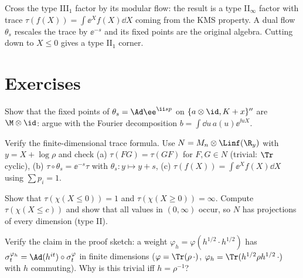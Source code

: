 \begin{keyidea}
Cross the type III$_1$ factor by its modular flow: the result is a type II$_\infty$ factor with trace $\tau(f(X))=\int\ee^{X}f(X)\dd X$ coming from the KMS property. A dual flow $\theta_s$ rescales the trace by $\ee^{-s}$ and its fixed points are the original algebra. Cutting down to $X\le0$ gives a type II$_1$ corner.
\end{keyidea}

\section*{Exercises}
\begin{exercise}
Show that the fixed points of $\theta_s=\Ad\ee^{\ii sp}$ on $\{a\otimes\id,K+x\}''$ are $\M\otimes\id$: argue with the Fourier decomposition $b=\int\dd u\,a(u)\ee^{\ii uX}$.
\end{exercise}
\begin{exercise}
Verify the finite-dimensional trace formula. Use $N=M_n\otimes\Linf(\R_y)$ with $y=X+\log\rho$ and check (a) $\tau(FG)=\tau(GF)$ for $F,G\in N$ (trivial: $\Tr$ cyclic), (b) $\tau\circ\theta_s=\ee^{-s}\tau$ with $\theta_s:y\mapsto y+s$, (c) $\tau(f(X))=\int\ee^Xf(X)\dd X$ using $\sum p_i=1$.
\end{exercise}
\begin{exercise}
Show that $\tau(\chi(X\le0))=1$ and $\tau(\chi(X\ge0))=\infty$. Compute $\tau(\chi(X\le c))$ and show that all values in $(0,\infty)$ occur, so $N$ has projections of every dimension (type II).
\end{exercise}
\begin{exercise}
Verify the claim in the proof sketch: a weight $\varphi_h=\varphi(h^{1/2}\cdot h^{1/2})$ has $\sigma^{\varphi_h}_t=\Ad(h^{it})\circ\sigma^\varphi_t$ in finite dimensions ($\varphi=\Tr(\rho\,\cdot)$, $\varphi_h=\Tr(h^{1/2}\rho h^{1/2}\,\cdot)$ with $h$ commuting). Why is this trivial iff $h=\rho^{-1}$?
\end{exercise}
